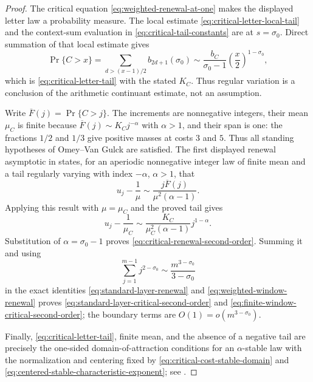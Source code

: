 \begin{proof}
The critical equation \eqref{eq:weighted-renewal-at-one} makes the displayed
letter law a probability measure.  The local estimate
\eqref{eq:critical-letter-local-tail} and the context-sum evaluation in
\eqref{eq:critical-tail-constants} are
 at \(s=\sigma_0\).  Direct summation
of that local estimate gives
\[
 \Pr\{C>x\}
 =\sum_{d>(x-1)/2}b_{2d+1}(\sigma_0)
 \sim\frac{b_C}{\sigma_0-1}
      \left(\frac{x}{2}\right)^{1-\sigma_0},
\]
which is \eqref{eq:critical-letter-tail} with the stated \(K_C\).  Thus
regular variation is a conclusion of the arithmetic continuant estimate,
not an assumption.

Write \(\overline F(j)=\Pr\{C>j\}\).  The increments are nonnegative
integers, their mean \(\mu_C\) is finite because
\(\overline F(j)\sim K_Cj^{-\alpha}\) with \(\alpha>1\), and their span is
one: the fractions \(1/2\) and \(1/3\) give positive masses at costs \(3\)
and \(5\).  Thus all standing hypotheses of Omey--Van Gulck are satisfied.
The first displayed renewal asymptotic in
\cite[Sec.~3.2]{OmeyVanGulck2015} states, for an aperiodic nonnegative
integer law of finite mean and a tail regularly varying with index
\(-\alpha\), \(\alpha>1\), that
\begin{equation}
 u_j-\frac1\mu
 \sim\frac{j\overline F(j)}{\mu^2(\alpha-1)}.
 \label{eq:omey-van-gulck-renewal-asymptotic}
\end{equation}
Applying this result with \(\mu=\mu_C\) and the proved tail gives
\[
 u_j-\frac1{\mu_C}
 \sim\frac{K_C}{\mu_C^2(\alpha-1)}j^{1-\alpha}.
\]
Substitution of \(\alpha=\sigma_0-1\) proves
\eqref{eq:critical-renewal-second-order}.  Summing it and using
\[
 \sum_{j=1}^{m-1}j^{2-\sigma_0}
 \sim\frac{m^{3-\sigma_0}}{3-\sigma_0}
\]
in the exact identities \eqref{eq:standard-layer-renewal} and
\eqref{eq:weighted-window-renewal} proves
\eqref{eq:standard-layer-critical-second-order} and
\eqref{eq:finite-window-critical-second-order}; the boundary terms are
\(O(1)=o(m^{3-\sigma_0})\).

Finally, \eqref{eq:critical-letter-tail}, finite mean, and the absence of a
negative tail are precisely the one-sided domain-of-attraction conditions
for an \(\alpha\)-stable law with the normalization and centering fixed by
\eqref{eq:critical-cost-stable-domain} and
\eqref{eq:centered-stable-characteristic-exponent}; see
\cite[Ch.~XVII]{Feller1971}.
\end{proof}
